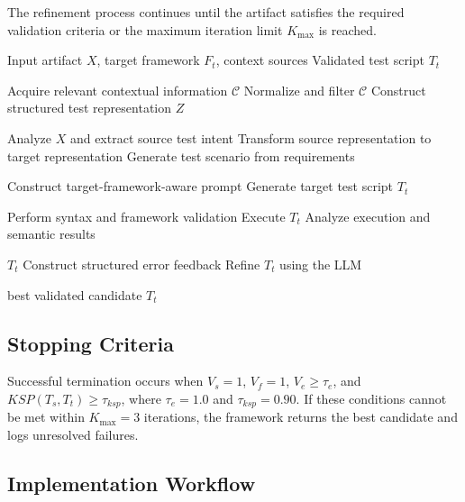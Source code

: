\documentclass[pdflatex,sn-mathphys-num]{sn-jnl}
\begin{document}
The refinement process continues until the artifact satisfies the required
validation criteria or the maximum iteration limit $K_{\max}$ is reached.

\begin{algorithm}[t]
\caption{Context-Aware Test Generation and Migration}
\label{alg:framework}
\begin{algorithmic}[1]

\Require Input artifact $X$, target framework $F_t$, context sources
\Ensure Validated test script $T_t$

\State Acquire relevant contextual information $\mathcal{C}$
\State Normalize and filter $\mathcal{C}$
\State Construct structured test representation $Z$

    \State Analyze $X$ and extract source test intent
    \State Transform source representation to target representation
\Else
    \State Generate test scenario from requirements
\EndIf

\State Construct target-framework-aware prompt
\State Generate target test script $T_t$

    \State Perform syntax and framework validation
    \State Execute $T_t$
    \State Analyze execution and semantic results

        \State \Return $T_t$
    \Else
        \State Construct structured error feedback
        \State Refine $T_t$ using the LLM
    \EndIf
\EndFor

\State \Return best validated candidate $T_t$

\end{algorithmic}
\end{algorithm}

\subsection{Stopping Criteria}
\label{subsec:stopping-criteria}

Successful termination occurs when $V_s = 1$, $V_f = 1$, $V_e \geq \tau_e$, and
$KSP(T_s, T_t) \geq \tau_{ksp}$, where $\tau_e = 1.0$ and $\tau_{ksp} = 0.90$.
If these conditions cannot be met within $K_{\max} = 3$ iterations, the
framework returns the best candidate and logs unresolved failures.

\subsection{Implementation Workflow}
\label{subsec:implementation-workflow}
\end{document}
